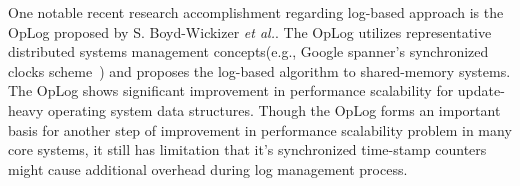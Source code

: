 One notable recent research accomplishment regarding log-based approach is
the OpLog proposed by S. Boyd-Wickizer \textit{et al.}.
The OpLog utilizes representative distributed systems management concepts(e.g., Google spanner's 
synchronized clocks scheme~\cite{Corbett2013SGG}) and proposes the log-based algorithm to shared-memory systems.
The OpLog shows significant improvement in performance scalability for update-heavy operating system
data structures.
Though the OpLog forms an important basis for another step of improvement in performance
scalability problem in many core systems, it still has limitation that it's 
synchronized time-stamp counters might cause additional overhead during log management
process.
